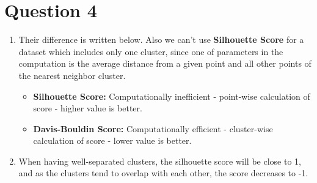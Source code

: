 \documentclass[a4paper,12pt]{article}
\begin{document}
\section*{Question 4}
\begin{enumerate}[label=\alph*)]
  \item Their difference is written below. Also we can't use \textbf{Silhouette Score} for a dataset which includes only one cluster, since one of parameters in the computation is the average distance from a given point and all other points of the nearest neighbor cluster.  
  \begin{itemize}
    \item \textbf{Silhouette Score:} Computationally inefficient - point-wise calculation of score - higher value is better.
    \item \textbf{Davis-Bouldin Score:} Computationally efficient - cluster-wise calculation of score - lower value is better.
  \end{itemize}

  \item When having well-separated clusters, the silhouette score will be close to 1, and as the clusters tend to overlap with each other, the score decreases to -1. 
\end{enumerate}
\end{document}
